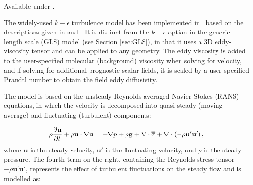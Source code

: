 Available under .

The widely-used $k-\epsilon$ turbulence model has been implemented in \fluidity\ based on the descriptions given in
\citet{wilcox1998turbulence} and \citet{Rodi1993}. It is distinct from the $k-\epsilon$ option in the generic length scale (GLS) model (see
Section \ref{sec:GLS}), in that it uses a 3D eddy-viscosity tensor and can be applied to any geometry. The eddy viscosity is added to the user-specified molecular (background) viscosity when solving for velocity, and if solving for additional prognostic scalar fields, it is scaled by a user-specified Prandtl number to obtain the field eddy diffusivity.

The model is based on the unsteady Reynolds-averaged Navier-Stokes (RANS) equations, in which the velocity is decomposed into quasi-steady (moving average) and fluctuating (turbulent) components:


\begin{equation}\label{eq:RANS}
\rho\frac{\partial \mathbf{u}}{\partial t} + \rho\mathbf{u}\cdot\nabla\mathbf{u} =
-\nabla p + \rho\mathbf{g} + \nabla\cdot\overline{\overline{\tau}} + \nabla\cdot\left(-\rho\mathbf{u}'\mathbf{u}'\right),
\end{equation}
where $\mathbf{u}$ is the steady velocity, $\mathbf{u}'$ is the fluctuating velocity, and $p$ is the steady pressure.
The fourth term on the right, containing the Reynolds stress tensor $-\rho\mathbf{u}'\mathbf{u}'$, represents the effect of turbulent fluctuations on the steady flow and is modelled as:

